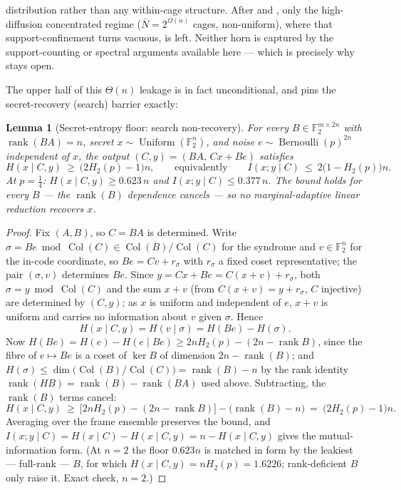 \documentclass[11pt,a4paper]{article}
\theoremstyle{plain}
\newtheorem{lemma}[theorem]{Lemma}
\theoremstyle{definition}
\newcommand{\F}{\mathbb{F}}
\begin{document}
distribution rather than any within-cage structure. After  and , only the high-diffusion concentrated regime ($\bar N=2^{\Omega(n)}$ cages, non-uniform), where that support-confinement turns vacuous, is left. Neither horn is captured by the support-counting or spectral arguments available here --- which is precisely why  stays open.

The upper half of this $\Theta(n)$ leakage is in fact unconditional, and pins the secret-recovery (search) barrier exactly:

\begin{lemma}[Secret-entropy floor: search non-recovery]
\label{lem:secret-floor}
For every $B\in\F_2^{m\times 2n}$ with $\operatorname{rank}(BA)=n$, secret $x\sim\operatorname{Uniform}(\F_2^n)$, and noise $e\sim\operatorname{Bernoulli}(p)^{2n}$ independent of $x$, the output $(C,y)=(BA,\,Cx+Be)$ satisfies
\[
H(x\mid C,y)\ \ge\ \bigl(2H_2(p)-1\bigr)n,\qquad\text{equivalently}\qquad I(x;y\mid C)\ \le\ 2\bigl(1-H_2(p)\bigr)n .
\]
At $p=\tfrac14$: $H(x\mid C,y)\ge 0.623\,n$ and $I(x;y\mid C)\le 0.377\,n$. The bound holds for \emph{every} $B$ --- the $\operatorname{rank}(B)$ dependence cancels --- so no marginal-adaptive linear reduction \emph{recovers} $x$.
\end{lemma}

\begin{proof}
Fix $(A,B)$, so $C=BA$ is determined. Write $\sigma=Be\bmod\operatorname{Col}(C)\in\operatorname{Col}(B)/\operatorname{Col}(C)$ for the syndrome and $v\in\F_2^n$ for the in-code coordinate, so $Be=Cv+r_\sigma$ with $r_\sigma$ a fixed coset representative; the pair $(\sigma,v)$ determines $Be$. Since $y=Cx+Be=C(x+v)+r_\sigma$, both $\sigma=y\bmod\operatorname{Col}(C)$ and the sum $x+v$ (from $C(x+v)=y+r_\sigma$, $C$ injective) are determined by $(C,y)$; as $x$ is uniform and independent of $e$, $x+v$ is uniform and carries no information about $v$ given $\sigma$. Hence
\[
H(x\mid C,y)=H(v\mid \sigma)=H(Be)-H(\sigma).
\]
Now $H(Be)=H(e)-H(e\mid Be)\ge 2nH_2(p)-(2n-\operatorname{rank}B)$, since the fibre of $e\mapsto Be$ is a coset of $\ker B$ of dimension $2n-\operatorname{rank}(B)$; and $H(\sigma)\le\dim\bigl(\operatorname{Col}(B)/\operatorname{Col}(C)\bigr)=\operatorname{rank}(B)-n$ by the rank identity $\operatorname{rank}(HB)=\operatorname{rank}(B)-\operatorname{rank}(BA)$ used above. Subtracting, the $\operatorname{rank}(B)$ terms cancel:
\[
H(x\mid C,y)\ \ge\ \bigl[2nH_2(p)-(2n-\operatorname{rank}B)\bigr]-\bigl(\operatorname{rank}(B)-n\bigr)\ =\ \bigl(2H_2(p)-1\bigr)n.
\]
Averaging over the frame ensemble preserves the bound, and $I(x;y\mid C)=H(x\mid C)-H(x\mid C,y)=n-H(x\mid C,y)$ gives the mutual-information form. (At $n=2$ the floor $0.623n$ is matched in form by the leakiest --- full-rank --- $B$, for which $H(x\mid C,y)=nH_2(p)=1.6226$; rank-deficient $B$ only raise it. Exact check, $n=2$.)
\end{proof}
\end{document}
